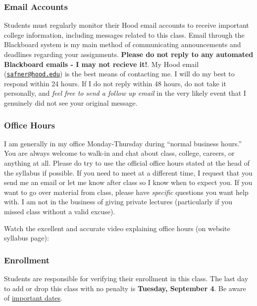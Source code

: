 \documentclass{article}
\begin{document}
\hypertarget{email-accounts}{%
\subsubsection{Email Accounts}\label{email-accounts}}

Students must regularly monitor their Hood email accounts to receive
important college information, including messages related to this class.
Email through the Blackboard system is my main method of communicating
announcements and deadlines regarding your assignments. \textbf{Please
do not reply to any automated Blackboard emails - I may not recieve
it!}. My Hood email
(\href{mailto:safner@hood.edu}{\nolinkurl{safner@hood.edu}}) is the best
means of contacting me. I will do my best to respond within 24 hours. If
I do not reply within 48 hours, do not take it personally, and
\emph{feel free to send a follow up email} in the very likely event that
I genuinely did not see your original message.

\hypertarget{office-hours}{%
\subsubsection{Office Hours}\label{office-hours}}

I am generally in my office Monday-Thursday during ``normal business
hours.'' You are always welcome to walk-in and chat about class,
college, careers, or anything at all. Please do try to use the official
office hours stated at the head of the syllabus if possible. If you need
to meet at a different time, I request that you send me an email or let
me know after class so I know when to expect you. If you want to go over
material from class, please have \emph{specific} questions you want help
with. I am not in the business of giving private lectures (particularly
if you missed class without a valid excuse).

Watch the excellent and accurate video explaining office hours (on
website syllabus page):

\hypertarget{enrollment}{%
\subsubsection{Enrollment}\label{enrollment}}

Students are responsible for verifying their enrollment in this class.
The last day to add or drop this class with no penalty is
\textbf{Tuesday, September 4}. Be aware of
\href{https://www.hood.edu/offices-services/registrars-office/academic-calendar}{important
dates}.
\end{document}
